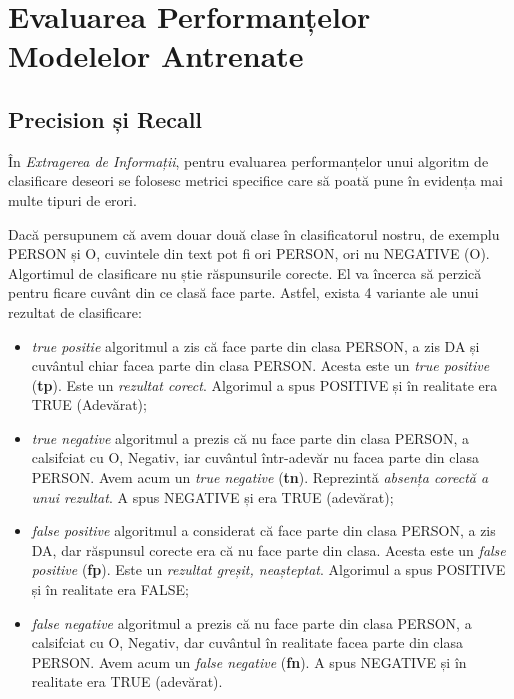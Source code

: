 \section{Evaluarea Performanțelor Modelelor Antrenate}
\label{sec:model-measurements}

\subsection{Precision și Recall}
\label{subsec:precision-and-recall}

În\textit{ Extragerea de Informații}, pentru evaluarea performanțelor unui algoritm de clasificare deseori se folosesc metrici specifice care să poată pune în evidența mai multe tipuri de erori.

Dacă persupunem că avem douar două clase în clasificatorul nostru, de exemplu PERSON și O, cuvintele din text pot fi ori PERSON, ori nu NEGATIVE (O). Algortimul de clasificare nu știe răspunsurile corecte. El va încerca să perzică pentru ficare cuvânt din ce clasă face parte. Astfel, exista 4 variante ale unui rezultat de clasificare:


\begin{itemize}
\item \textit{true positie} algoritmul a zis că face parte din clasa PERSON, a zis DA și cuvântul chiar facea parte din clasa PERSON. Acesta este un \textit{true positive} (\textbf{tp}). Este un \textit{rezultat corect}. Algorimul a spus POSITIVE și în realitate era TRUE (Adevărat);

\item \textit{true negative} algoritmul a prezis că nu face parte din clasa PERSON, a calsifciat cu O, Negativ, iar cuvântul într-adevăr nu facea parte din clasa PERSON. Avem acum un \textit{true negative} (\textbf{tn}). Reprezintă \textit{absența corectă a unui rezultat}. A spus NEGATIVE și era TRUE (adevărat);

\item \textit{false positive} algoritmul a considerat că face parte din clasa PERSON, a zis DA, dar răspunsul corecte era că nu face parte din clasa. Acesta este un \textit{false positive} (\textbf{fp}). Este un \textit{rezultat greșit, neașteptat}. Algorimul a spus POSITIVE și în realitate era FALSE;

\item \textit{false negative} algoritmul a prezis că nu face parte din clasa PERSON, a calsifciat cu O, Negativ, dar cuvântul în realitate facea parte din clasa PERSON. Avem acum un \textit{false negative} (\textbf{fn}). A spus NEGATIVE și în realitate era TRUE (adevărat).

\end{itemize}

